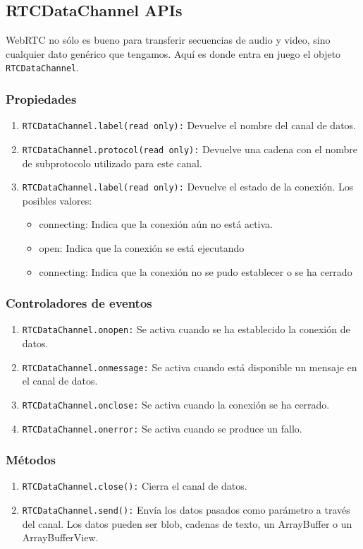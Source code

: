 \subsection*{RTCDataChannel APIs}
WebRTC no sólo es bueno para transferir secuencias de audio y video, sino cualquier dato genérico que tengamos. Aquí es donde entra en juego el objeto \texttt{RTCDataChannel}.
\subsubsection*{Propiedades}
\begin{enumerate}
\item \texttt{RTCDataChannel.label(read only):} Devuelve el nombre del canal de datos.
\item \texttt{RTCDataChannel.protocol(read only):} Devuelve una cadena con el nombre de subprotocolo utilizado para este canal.
\item \texttt{RTCDataChannel.label(read only):} Devuelve el estado de la conexión. Los posibles valores:
  \begin{itemize}
    \item connecting: Indica que la conexión aún no está activa.
    \item open: Indica que la conexión se está ejecutando
    \item connecting: Indica que la conexión no se pudo establecer o se ha cerrado
  \end{itemize}
\end{enumerate}
\subsubsection*{Controladores de eventos}
\begin{enumerate}
\item \texttt{RTCDataChannel.onopen:} Se activa cuando se ha establecido la conexión de datos.
\item \texttt{RTCDataChannel.onmessage:} Se activa cuando está disponible un mensaje en el canal de datos.
\item \texttt{RTCDataChannel.onclose:} Se activa cuando la conexión se ha cerrado.
\item \texttt{RTCDataChannel.onerror:} Se activa cuando se produce un fallo.
\end{enumerate}
\subsubsection*{Métodos}
\begin{enumerate}
\item \texttt{RTCDataChannel.close():} Cierra el canal de datos.
\item \texttt{RTCDataChannel.send():} Envía los datos pasados como parámetro a través del canal. Los datos pueden ser blob, cadenas de texto, un ArrayBuffer o un ArrayBufferView.
\end{enumerate}
